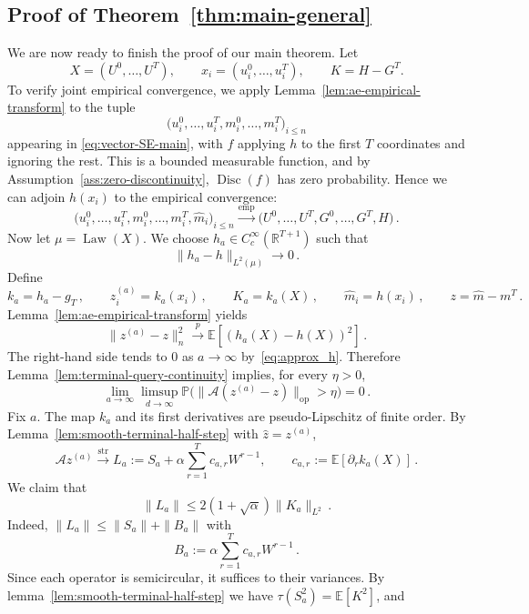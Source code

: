 \documentclass[11pt]{article}
\theoremstyle{definition}
\theoremstyle{remark}
\numberwithin{equation}{section}
\numberwithin{theorem}{section}
\newcommand{\R}{\mathbb R}
\newcommand{\E}{\mathbb E}
\newcommand{\Prob}{\mathbb P}
\newcommand{\op}{\mathrm{op}}
\newcommand{\Law}{\operatorname{Law}}
\newcommand{\cA}{\mathcal A}
\begin{document}
\subsection{Proof of Theorem~\ref{thm:main-general}}
We are now ready to finish the proof of our main theorem.
Let
\[
 X=(U^0,\ldots,U^T),
 \qquad
 x_i=(u_i^0,\ldots,u_i^T),
 \qquad
 K=H-G^T.
\]
To verify joint empirical convergence, we apply
Lemma~\ref{lem:ae-empirical-transform} to the tuple 
\[\bigl(u_i^0,\ldots,u_i^{T},m_i^0,\ldots,m_i^T\bigr)_{i\le n}\] 
appearing in \eqref{eq:vector-SE-main}, with $f$ applying $h$ to the first $T$ coordinates and ignoring the rest. This is a bounded measurable function, and by Assumption~\ref{ass:zero-discontinuity}, $\operatorname{Disc}(f)$ has zero probability. Hence we can adjoin $h(x_i)$ to the empirical convergence:
\[\bigl(u_i^0,\ldots,u_i^{T},m_i^0,\ldots,m_i^T,\widehat m_i\bigr)_{i\le n}
  \xrightarrow{\mathrm{emp}}
  \bigl(U^0,\ldots,U^{T},G^0,\ldots,G^T, H\bigr)\,.\]
%  
Now let $\mu=\Law(X)$.  We choose
$h_a\in C_c^\infty(\R^{T+1})$ such that
\begin{equation}\label{eq:approx_h}
\|h_a-h\|_{L^2(\mu)}\longrightarrow 0 \,.	
\end{equation}
%
Define
\[
 k_a=h_a-g_T\,,
 \qquad
 z_i^{(a)}=k_a(x_i)\,,
 \qquad
 K_a=k_a(X)\,,
 \qquad
 \widehat m_i = h(x_i)\,,\qquad 
 z=\widehat m-m^T\,.
\]
Lemma~\ref{lem:ae-empirical-transform} yields
\[
 \|z^{(a)}-z\|_n^2
 \xrightarrow{p}
 \E[(h_a(X)-h(X))^2]\,.
\]
The right-hand side tends to 0 as $a \to \infty$ by~\eqref{eq:approx_h}. Therefore Lemma~\ref{lem:terminal-query-continuity} implies, for every $\eta>0$,
\begin{equation}\label{eq:terminal-smooth-operator-error}
 \lim_{a\to\infty}\limsup_{d\to\infty}
 \Prob\bigl(\|\cA(z^{(a)}-z)\|_{\op}>\eta\bigr)=0\,.
\end{equation}
%
Fix $a$.  The map $k_a$ and its first derivatives are
pseudo-Lipschitz of finite order.  By
Lemma~\ref{lem:smooth-terminal-half-step} with $\widehat z = z^{(a)}$,
\begin{equation}\label{eq:strong_z_a}
 \cA z^{(a)}
 \xrightarrow{\mathrm{str}}
 L_a:=
 S_a+\alpha\sum_{r=1}^Tc_{a,r}W^{r-1},
 \qquad
 c_{a,r}:=\E[\partial_rk_a(X)]\,.
\end{equation}
%
We claim that 
\[
 \|L_a\| \le 2(1+\sqrt\alpha)\|K_a\|_{L^2}\,.
\]
Indeed, $\|L_a\| \le \|S_a\| + \|B_a\|$ with 
\[
 B_a:=\alpha\sum_{r=1}^Tc_{a,r}W^{r-1}\,.
\]
Since each operator is semicircular, it suffices to their variances.
By lemma~\ref{lem:smooth-terminal-half-step} we have $\tau(S_a^2) = \E[K^2]$, and    
\end{document}
